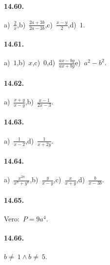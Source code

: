 \paragraph{14.60.}
a)~$\frac{2}{x}$,\quad b)~$\frac{2a+3b}{2a-3b}$,\quad c)~$\frac{x-y}{2}$,\quad d)~$1$.

\paragraph{14.61.}
a)~$1$,\quad b)~$x$,\quad c)~$0$,\quad d)~$\frac{ax-by}{ax+by}$\quad e)~$a^{2}-b^{2}$.

\paragraph{14.62.}
a)~$\frac{x+y}{x-y}$,\quad b)~$\frac{x-1}{2x-3}$.

\paragraph{14.63.}
a)~$\frac{1}{x-2}$,\quad d)~$\frac{1}{x+2y}$.

\paragraph{14.64.}
a)~$\frac{x^{2n}}{x^{n}+y^{n}}$,\quad b)~$\frac{y}{x-y}$,\quad c)~$\frac{x}{x+y}$,\quad d)~$\frac{b}{x-3b}$.

\paragraph{14.65.}Vero:~$P=9a^{4}$.

\paragraph{14.66.}$b\neq~1\wedge b\neq~5$.
